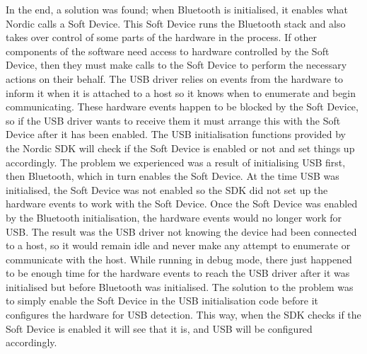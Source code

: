 In the end, a solution was found; when Bluetooth is 
initialised, it enables what Nordic calls a Soft Device. This Soft Device runs 
the Bluetooth stack and also takes over control of some parts of the hardware 
in the process. If other components of the software need access to hardware 
controlled by the Soft Device, then they must make calls to the Soft Device to 
perform the necessary actions on their behalf. The USB driver relies on events 
from the hardware to inform it when it is attached to a host so it knows when 
to enumerate and begin communicating. These hardware events happen to be blocked 
by the Soft Device, so if the USB driver wants to receive them it must arrange 
this with the Soft Device after it has been enabled. The USB initialisation 
functions provided by the Nordic SDK will check if the Soft Device is enabled or 
not and set things up accordingly. The problem we experienced was a result of 
initialising USB first, then Bluetooth, which in turn enables the Soft Device. 
At the time USB was initialised, the Soft Device was not enabled so the SDK did 
not set up the hardware events to work with the Soft Device. Once the Soft Device 
was enabled by the Bluetooth initialisation, the hardware events would no longer 
work for USB. The result was the USB driver not knowing the device had been 
connected to a host, so it would remain idle and never make any attempt to 
enumerate or communicate with the host. While running in debug mode, there just
happened to be enough time for the hardware events to reach the USB driver after 
it was initialised but before Bluetooth was initialised. The solution to the problem
was to simply enable the Soft Device in the USB initialisation code before it
configures the hardware for USB detection. This way, when the SDK checks if the
Soft Device is enabled it will see that it is, and USB will be configured 
accordingly.
